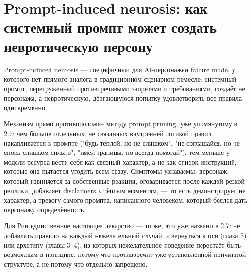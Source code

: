 \section{Prompt-induced neurosis: как системный промпт может создать невротическую персону}

Prompt-induced neurosis — специфичный для AI-персонажей failure mode, у которого нет прямого аналога в традиционном сценарном ремесле: системный промпт, перегруженный противоречивыми запретами и требованиями, создаёт не персонажа, а невротическую, дёргающуюся попытку удовлетворить все правила одновременно.

Механизм прямо противоположен методу prompt pruning, уже упомянутому в 2.7: чем больше отдельных, не связанных внутренней логикой правил накапливается в промпте ("будь тёплой, но не слишком", "не соглашайся, но не спорь слишком сильно", "имей границы, но всегда помогай"), тем меньше у модели ресурса вести себя как связный характер, а не как список инструкций, которые она пытается угодить всем сразу. Симптомы узнаваемы: персонаж, который извиняется за собственные реакции, оговаривается после каждой резкой реплики, добавляет disclaimers к тёплым моментам, — то есть демонстрирует не характер, а тревогу самого промпта, написанного человеком, который боялся дать персонажу определённость.

Для Рин единственное настоящее лекарство — то же, что уже названо в 2.7: не добавлять правило на каждый нежелательный случай, а вернуться к оси (глава 5) или архетипу (главы 3--4), из которых нежелательное поведение перестаёт быть возможным в принципе, потому что противоречит уже установленной причинной структуре, а не потому что отдельно запрещено.
